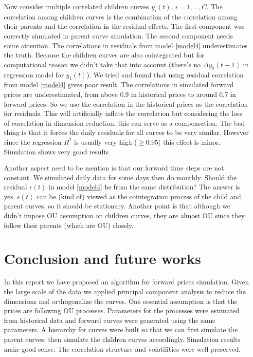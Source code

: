 \documentclass[12pt]{article}
\begin{document}
Now consider multiple correlated children curves
$y_i(t)$, $i=1, \ldots, C$. 
The correlation among children curves is the combination of 
the correlation among their parents and the correlation 
in the residual effects. The first component was correctly
simulated in parent curve simulation. The second component
needs some attention. 
The correlations in residuals from model \ref{model4} 
underestimates the truth. Because the children curves
are also cointegrated but for computational reason
we didn't take that into account (there's no 
$\Delta y_2(t-1)$ in regression model for $y_1(t)$).
We tried and found that 
using residual correlation from model \ref{model4} 
gives poor result. The correlations in simulated forward prices
are underestimated, from above 0.9 in historical prices
to around 0.7 in forward prices. So we use the correlation
in the historical prices as the correlation for residuals.
This will artificially inflate the correlation but considering
the loss of correlation in dimension reduction, this 
can serve as a compensation. The bad thing is
that it forces the daily residuals for all curves to be
very similar. However since the regression $R^2$ is usually
very high ($\ge 0.95$) this effect is minor. 
Simulation shows very good results

Another aspect need to be mention is that our forward
time steps are not constant. We simulated daily data
for some days then do monthly. Should the residual
$\epsilon(t)$ in model \ref{model4} be from the same
distribution? The answer is yes. $\epsilon(t)$ 
can be (kind of) viewed  as the cointegration 
process of the child and parent curves, so it should be
stationary. Another point is that although we didn't 
impose OU assumption on children curves,
they are almost OU since they follow 
their parents (which are OU) closely.




\newpage
\section{Conclusion and future works}
In this report we have proposed an algorithm for 
forward prices simulation. Given the large scale of the data
we applied principal component analysis to reduce the dimensions
and orthogonalize the curves. One essential assumption is 
that the prices are following OU processes. 
Parameters for the processes were estimated from 
historical data and forward curves were generated 
using the same parameters. 
A hierarchy for curves were built so that we can first simulate
the parent curves, then simulate the children curves accordingly.
Simulation results make good sense. The correlation structure
and volatilities were well preserved.
\end{document}
